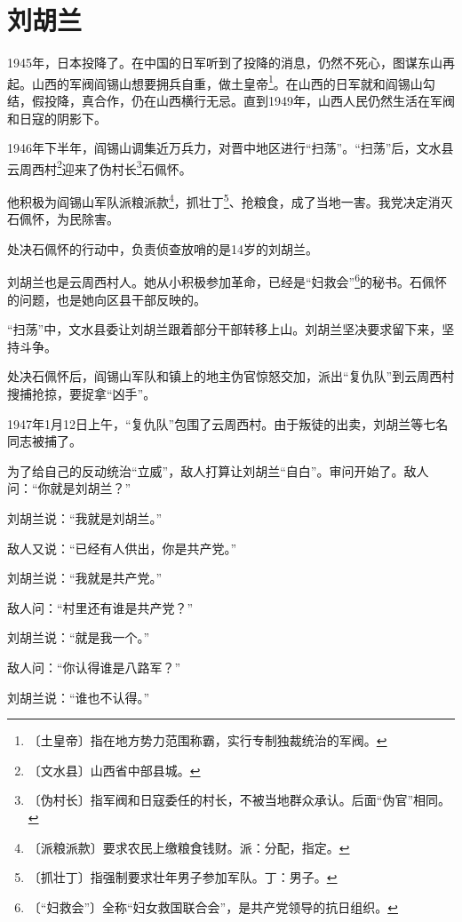 \documentclass[12pt,UTF-8,openany]{ctexbook}
\begin{document}
\chapter{刘胡兰}

\begin{normalsize}
    
    1945年，日本投降了。在中国的日军听到了投降的消息，仍然不死心，图谋东山再起。山西的军阀阎锡山想要拥兵自重，做土皇帝\footnote{〔土皇帝〕指在地方势力范围称霸，实行专制独裁统治的军阀。}。在山西的日军就和阎锡山勾结，假投降，真合作，仍在山西横行无忌。直到1949年，山西人民仍然生活在军阀和日寇的阴影下。
    
    1946年下半年，阎锡山调集近万兵力，对晋中地区进行“扫荡”。“扫荡”后，文水县云周西村\footnote{〔文水县〕山西省中部县城。}迎来了伪村长\footnote{〔伪村长〕指军阀和日寇委任的村长，不被当地群众承认。后面“伪官”相同。}石佩怀。
    
    他积极为阎锡山军队派粮派款\footnote{〔派粮派款〕要求农民上缴粮食钱财。派：分配，指定。}，抓壮丁\footnote{〔抓壮丁〕指强制要求壮年男子参加军队。丁：男子。}、抢粮食，成了当地一害。我党决定消灭石佩怀，为民除害。
    
    处决石佩怀的行动中，负责侦查放哨的是14岁的刘胡兰。
    
    刘胡兰也是云周西村人。她从小积极参加革命，已经是“妇救会”\footnote{〔“妇救会”〕全称“妇女救国联合会”，是共产党领导的抗日组织。}的秘书。石佩怀的问题，也是她向区县干部反映的。
    
    “扫荡”中，文水县委让刘胡兰跟着部分干部转移上山。刘胡兰坚决要求留下来，坚持斗争。
    
    处决石佩怀后，阎锡山军队和镇上的地主伪官惊怒交加，派出“复仇队”到云周西村搜捕抢掠，要捉拿“凶手”。
    
    1947年1月12日上午，“复仇队”包围了云周西村。由于叛徒的出卖，刘胡兰等七名同志被捕了。
    
    为了给自己的反动统治“立威”，敌人打算让刘胡兰“自白”。审问开始了。敌人问：“你就是刘胡兰？”
    
    刘胡兰说：“我就是刘胡兰。”
    
    敌人又说：“已经有人供出，你是共产党。”
    
    刘胡兰说：“我就是共产党。”
    
    敌人问：“村里还有谁是共产党？”
    
    刘胡兰说：“就是我一个。”
    
    敌人问：“你认得谁是八路军？”
    
    刘胡兰说：“谁也不认得。”
    

\end{normalsize}
\end{document}
